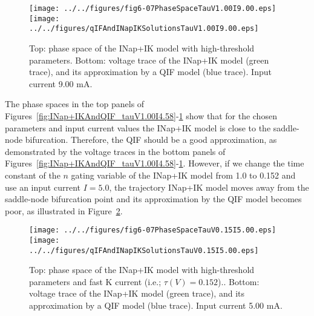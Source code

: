 \documentclass{article}
\begin{document}
\begin{figure}
\begin{center}
\texttt{[image: ../../figures/fig6-07PhaseSpaceTauV1.00I9.00.eps]}
\texttt{[image: ../../figures/qIFAndINapIKSolutionsTauV1.00I9.00.eps]}

\caption{Top: phase space of the INap+IK model with high-threshold parameters.
Bottom: voltage trace of the INap+IK model (green trace), and its
approximation by a QIF model (blue trace). Input current 9.00 mA.}

\label{fig:INap+IKAndQIF_tauV1.00I9.00}
\end{center}
\end{figure}

The phase spaces in the top panels of
Figures~\ref{fig:INap+IKAndQIF_tauV1.00I4.58}-\ref{fig:INap+IKAndQIF_tauV1.00I9.00}
show that for the chosen parameters and input current values the INap+IK model
is close to the saddle-node bifurcation. Therefore, the QIF should be a good
approximation, as demonstrated by the voltage traces in the bottom panels of
Figures~\ref{fig:INap+IKAndQIF_tauV1.00I4.58}-\ref{fig:INap+IKAndQIF_tauV1.00I9.00}.
However, if we change the time constant of the $n$ gating variable of the
INap+IK model from 1.0 to 0.152 and use an input current $I=5.0$, the
trajectory INap+IK model moves away from the saddle-node bifurcation point and
its approximation by the QIF model becomes poor, as illustrated in
Figure~\ref{fig:INap+IKAndQIF_tauV0.15I5.00}.

\begin{figure}
\begin{center}
\texttt{[image: ../../figures/fig6-07PhaseSpaceTauV0.15I5.00.eps]}
\texttt{[image: ../../figures/qIFAndINapIKSolutionsTauV0.15I5.00.eps]}

\caption{Top: phase space of the INap+IK model with high-threshold parameters
and fast K current (i.e.; $\tau(V)=0.152$)..
Bottom: voltage trace of the INap+IK model (green trace), and its
approximation by a QIF model (blue trace). Input current 5.00 mA.}

\label{fig:INap+IKAndQIF_tauV0.15I5.00}
\end{center}
\end{figure}



\end{document}
